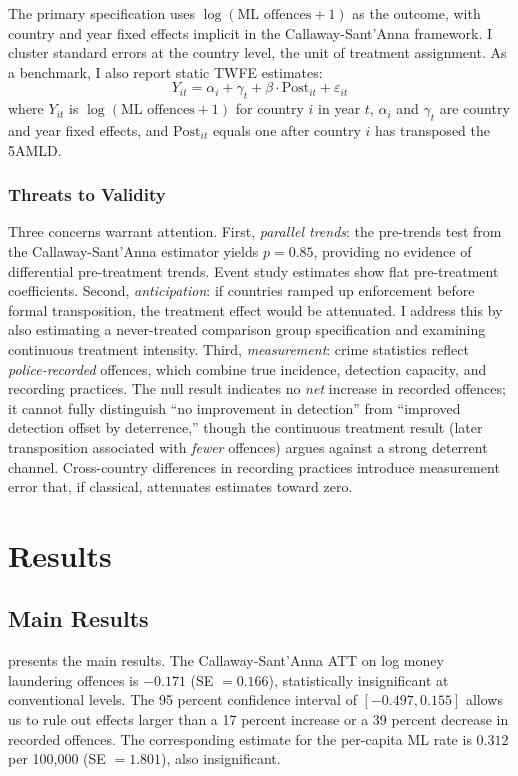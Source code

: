 \documentclass[12pt]{article}
\begin{document}
The primary specification uses $\log(\text{ML offences} + 1)$ as the outcome, with country and year fixed effects implicit in the Callaway-Sant'Anna framework. I cluster standard errors at the country level, the unit of treatment assignment. As a benchmark, I also report static TWFE estimates:
\begin{equation}
Y_{it} = \alpha_i + \gamma_t + \beta \cdot \text{Post}_{it} + \varepsilon_{it}
\end{equation}
where $Y_{it}$ is $\log(\text{ML offences} + 1)$ for country $i$ in year $t$, $\alpha_i$ and $\gamma_t$ are country and year fixed effects, and $\text{Post}_{it}$ equals one after country $i$ has transposed the 5AMLD.

\subsubsection*{Threats to Validity}
Three concerns warrant attention. First, \textit{parallel trends}: the pre-trends test from the Callaway-Sant'Anna estimator yields $p = 0.85$, providing no evidence of differential pre-treatment trends. Event study estimates show flat pre-treatment coefficients. Second, \textit{anticipation}: if countries ramped up enforcement before formal transposition, the treatment effect would be attenuated. I address this by also estimating a never-treated comparison group specification and examining continuous treatment intensity. Third, \textit{measurement}: crime statistics reflect \textit{police-recorded} offences, which combine true incidence, detection capacity, and recording practices. The null result indicates no \textit{net} increase in recorded offences; it cannot fully distinguish ``no improvement in detection'' from ``improved detection offset by deterrence,'' though the continuous treatment result (later transposition associated with \textit{fewer} offences) argues against a strong deterrent channel. Cross-country differences in recording practices introduce measurement error that, if classical, attenuates estimates toward zero.

\section{Results}
\label{sec:results}

\subsection{Main Results}

 presents the main results. The Callaway-Sant'Anna ATT on log money laundering offences is $-0.171$ (SE $= 0.166$), statistically insignificant at conventional levels. The 95 percent confidence interval of $[-0.497, 0.155]$ allows us to rule out effects larger than a 17 percent increase or a 39 percent decrease in recorded offences. The corresponding estimate for the per-capita ML rate is $0.312$ per 100,000 (SE $= 1.801$), also insignificant.
\end{document}
